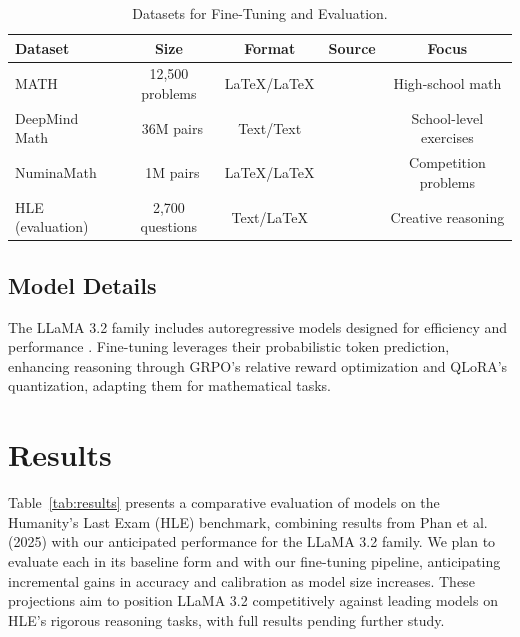 \documentclass{svproc}
\begin{document}
\begin{table}[H]
  \centering
  \begin{tabular}{lcccc}
    \toprule
    \textbf{Dataset} & \textbf{Size} & \textbf{Format} & \textbf{Source} & \textbf{Focus} \\
    \midrule
    MATH & 12,500 problems & LaTeX/LaTeX & \cite{hendrycksmath2021} & High-school math \\
    DeepMind Math & ~36M pairs & Text/Text & \cite{saxton2019analysingmathematicalreasoningabilities} & School-level exercises \\
    NuminaMath & ~1M pairs & LaTeX/LaTeX & \cite{numina_math_datasets} & Competition problems \\
    HLE (evaluation) & 2,700 questions & Text/LaTeX & \cite{phan2025humanitysexam} & Creative reasoning \\
    \bottomrule
  \end{tabular}
  \caption{Datasets for Fine-Tuning and Evaluation.}
  \label{tab:datasets}
\end{table}

\subsection{Model Details}

The LLaMA 3.2 family includes autoregressive models designed for efficiency and performance \cite{vaswani2023attentionneed}. Fine-tuning leverages their probabilistic token prediction, enhancing reasoning through GRPO’s relative reward optimization and QLoRA’s quantization, adapting them for mathematical tasks.


\section{Results}

Table~\ref{tab:results} presents a comparative evaluation of models on the Humanity's Last Exam (HLE) benchmark, combining results from Phan et al. (2025) with our anticipated performance for the LLaMA 3.2 family. We plan to evaluate each in its baseline form and with our fine-tuning pipeline, anticipating incremental gains in accuracy and calibration as model size increases. These projections aim to position LLaMA 3.2 competitively against leading models on HLE’s rigorous reasoning tasks, with full results pending further study.
\end{document}
